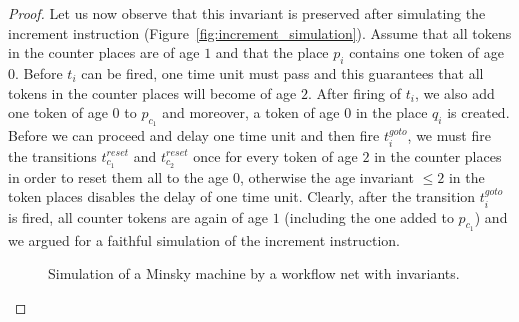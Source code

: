 \begin{proof}
Let us now observe
that this invariant is preserved after simulating the 
increment instruction (Figure~\ref{fig:increment_simulation}).
Assume that all tokens in the counter places are of age $1$ and that
the place $p_i$ contains one token of age $0$.
Before $t_i$ can be fired, one time unit must pass and this guarantees
that all tokens in the counter places will become of age $2$. After firing
of $t_i$, we also add one token of age $0$ to $p_{c_1}$ 
and moreover, a token of age $0$ in the place $q_i$ is created.
Before we can proceed and delay one time unit 
and then fire $t_i^{\mathit goto}$, we must fire the
transitions $t_{c_1}^{\mathit reset}$ and $t_{c_2}^{\mathit reset}$ once
for every token of age $2$ in the counter places in order to reset 
them all to the age $0$, otherwise the age invariant $\leq 2$ in the token 
places disables the delay of one time unit. Clearly, after the transition 
$t_i^{\mathit goto}$ is fired, all counter tokens are again of age $1$
(including the one added to $p_{c_1}$) and we argued for a faithful simulation
of the increment instruction.

\begin{figure}[h]
\captionsetup[figure]{position=above}
\caption{Simulation of a Minsky machine by a workflow net with invariants.}
\begin{center}
\begin{minipage}[c]{\textwidth}
\centering
{}
  \end{minipage}


\end{center}
\end{figure}
\end{proof}
